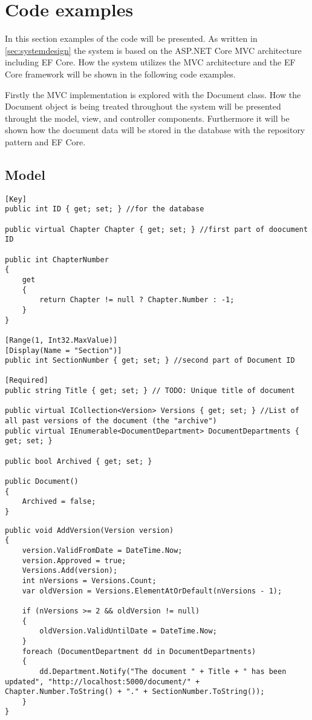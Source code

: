\section{Code examples}

In this section examples of the code will be presented.
As written in \cref{sec:systemdesign} the system is based on the ASP.NET Core MVC architecture including EF Core.
How the system utilizes the MVC architecture and the EF Core framework will be shown in the following code examples.

Firstly the MVC implementation is explored with the Document class.
How the Document object is being treated throughout the system will be presented throught the model, view, and controller components.
Furthermore it will be shown how the document data will be stored in the database with the repository pattern and EF Core.

\subsection{Model}

\begin{lstlisting}
[Key]
public int ID { get; set; } //for the database

public virtual Chapter Chapter { get; set; } //first part of doocument ID

public int ChapterNumber
{
	get
	{
		return Chapter != null ? Chapter.Number : -1;
	}
}

[Range(1, Int32.MaxValue)]
[Display(Name = "Section")]
public int SectionNumber { get; set; } //second part of Document ID

[Required]
public string Title { get; set; } // TODO: Unique title of document

public virtual ICollection<Version> Versions { get; set; } //List of all past versions of the document (the "archive")
public virtual IEnumerable<DocumentDepartment> DocumentDepartments { get; set; }

public bool Archived { get; set; }

public Document()
{
	Archived = false;
}

\end{lstlisting}

\begin{lstlisting}
public void AddVersion(Version version)
{
	version.ValidFromDate = DateTime.Now;
	version.Approved = true;
	Versions.Add(version);
	int nVersions = Versions.Count;
	var oldVersion = Versions.ElementAtOrDefault(nVersions - 1);

	if (nVersions >= 2 && oldVersion != null)
	{
		oldVersion.ValidUntilDate = DateTime.Now;
	}
	foreach (DocumentDepartment dd in DocumentDepartments)
	{
		dd.Department.Notify("The document " + Title + " has been updated", "http://localhost:5000/document/" + Chapter.Number.ToString() + "." + SectionNumber.ToString());
	}
}
\end{lstlisting}

